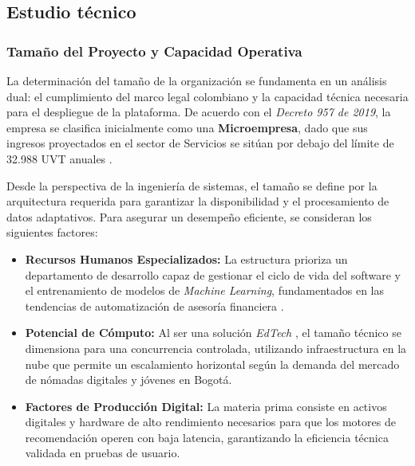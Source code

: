 {}
\subsection*{Estudio técnico}

{}
\subsubsection*{Tamaño del Proyecto y Capacidad Operativa}


La determinación del tamaño de la organización se fundamenta en un análisis dual: el cumplimiento del marco legal colombiano y la capacidad técnica necesaria para el despliegue de la plataforma. De acuerdo con el \textit{Decreto 957 de 2019}, la empresa se clasifica inicialmente como una \textbf{Microempresa}, dado que sus ingresos proyectados en el sector de Servicios se sitúan por debajo del límite de 32.988 UVT anuales \parencite{Decreto1297}.

Desde la perspectiva de la ingeniería de sistemas, el tamaño se define por la arquitectura requerida para garantizar la disponibilidad y el procesamiento de datos adaptativos. Para asegurar un desempeño eficiente, se consideran los siguientes factores:

\begin{itemize}
	\item \textbf{Recursos Humanos Especializados:} La estructura prioriza un departamento de desarrollo capaz de gestionar el ciclo de vida del software y el entrenamiento de modelos de \textit{Machine Learning}, fundamentados en las tendencias de automatización de asesoría financiera \parencite{BBVAResearch01}.
	
	\item \textbf{Potencial de Cómputo:} Al ser una solución \textit{EdTech} \parencite{UniversidadEuropea01}, el tamaño técnico se dimensiona para una concurrencia controlada, utilizando infraestructura en la nube que permite un escalamiento horizontal según la demanda del mercado de nómadas digitales y jóvenes en Bogotá.
	
	\item \textbf{Factores de Producción Digital:} La materia prima consiste en activos digitales y hardware de alto rendimiento necesarios para que los motores de recomendación operen con baja latencia, garantizando la eficiencia técnica validada en pruebas de usuario.
\end{itemize}

